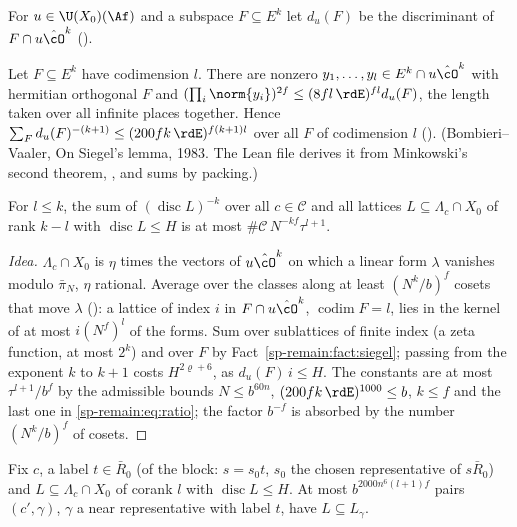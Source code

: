 For $u\in\U(X_0)(\Af)$ and a subspace $F\subseteq E^k$ let $d_u(F)$ be the discriminant of $F\cap
u\hat\cO^k$ ().

\begin{fact}\label{sp-remain:fact:siegel}
Let $F\subseteq E^k$ have codimension $l$. There are nonzero $y_1,\dots,y_l\in E^k\cap u\hat\cO^k$
with hermitian orthogonal $F$ and $(\prod_i\norm{y_i})^{2f}\le(8fl\,\rdE)^{fl}d_u(F)$, the length
taken over all infinite places together. Hence $\sum_F d_u(F)^{-(k+1)}\le(200fk\,\rdE)^{f(k+1)l}$
over all $F$ of codimension $l$ (). (Bombieri--Vaaler, On Siegel's lemma, 1983. The Lean file derives
it from Minkowski's second theorem, , and sums by packing.)
\end{fact}

\begin{proposition}
\label{sp-remain:prop:lattices}
For $l\le k$, the sum of $(\operatorname{disc}L)^{-k}$ over all $c\in\mathcal C$ and all lattices
$L\subseteq\Lambda_c\cap X_0$ of rank $k-l$ with $\operatorname{disc}L\le H$ is at most $\#\mathcal
C\,N^{-kf}\tau^{l+1}$.
\end{proposition}

\begin{proof}[Idea]
$\Lambda_c\cap X_0$ is $\eta$ times the vectors of $u\hat\cO^k$ on which a linear form $\lambda$
vanishes modulo $\bar\pi_N$, $\eta$ rational. Average over the classes along at least $(N^k/b)^f$ cosets that move $\lambda$
(): a lattice of index $i$ in $F\cap u\hat\cO^k$,
$\operatorname{codim}F=l$, lies in the kernel of at most $i(N^f)^l$ of the forms. Sum over sublattices
of finite index (a zeta function, at most $2^k$) and over $F$ by
Fact~\ref{sp-remain:fact:siegel}; passing from the exponent $k$ to $k+1$ costs $H^{2\varrho+6}$, as
$d_u(F)\,i\le H$. The constants are at most $\tau^{l+1}/b^f$ by the admissible bounds $N\le b^{60n}$,
$(200fk\,\rdE)^{1000}\le b$, $k\le f$ and the last one in \eqref{sp-remain:eq:ratio}; the factor $b^{-f}$
is absorbed by the number $(N^k/b)^f$ of cosets.
\end{proof}

\begin{proposition}\label{sp-remain:prop:frames}
Fix $c$, a label $t\in\bar R_0$ (of the block: $s=s_0t$, $s_0$ the chosen representative of $s\bar R_0$) and $L\subseteq\Lambda_c\cap X_0$
of corank $l$ with $\operatorname{disc}L\le H$. At most $b^{2000n^6(l+1)f}$ pairs $(c',\gamma)$,
$\gamma$ a near representative with label $t$, have $L\subseteq L_\gamma$.
\end{proposition}


